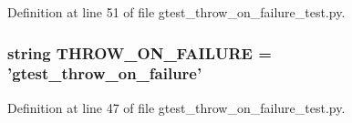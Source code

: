 \-Definition at line 51 of file gtest\-\_\-throw\-\_\-on\-\_\-failure\-\_\-test.\-py.

\hypertarget{namespacegtest__throw__on__failure__test_a70be9ce46b509a0d0cc94803b7e37994}{
\subsubsection[{\-T\-H\-R\-O\-W\-\_\-\-O\-N\-\_\-\-F\-A\-I\-L\-U\-R\-E}]{\setlength{\rightskip}{0pt plus 5cm}string {\bf \-T\-H\-R\-O\-W\-\_\-\-O\-N\-\_\-\-F\-A\-I\-L\-U\-R\-E} = 'gtest\-\_\-throw\-\_\-on\-\_\-failure'}}\label{df/da6/namespacegtest__throw__on__failure__test_a70be9ce46b509a0d0cc94803b7e37994}


\-Definition at line 47 of file gtest\-\_\-throw\-\_\-on\-\_\-failure\-\_\-test.\-py.

